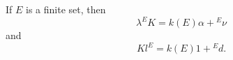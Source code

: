 If $E$ is a finite set, then
$$\lambda^E K = k(E) \alpha + {}^E \nu$$
and
$$K l^E = k(E) 1 + {}^E d.$$
